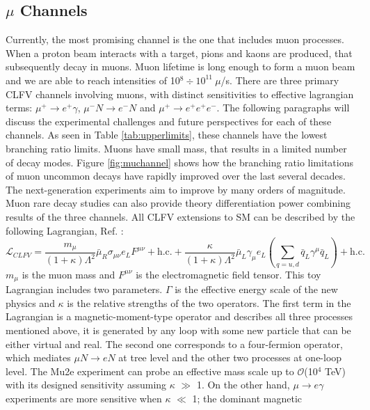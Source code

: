 \subsection{$\mu$ Channels}
Currently, the most promising channel is the one that includes muon processes. When a proton beam interacts with a target, pions and kaons are produced, that subsequently decay in muons. Muon lifetime is long enough to form a muon beam and we are able to reach intensities of 10$^8 \div 10^{11} \  \mu$/s. There are three primary CLFV channels involving muons, with distinct sensitivities to effective lagrangian terms: $\mu^+ \rightarrow e^+ \gamma$, $\mu^- N \rightarrow e^- N$ and $\mu^+ \rightarrow e^+ e^+ e^-$. The following paragraphs will discuss the experimental challenges and future perspectives for each of these channels. As seen in Table \ref{tab:upperlimits}, these channels have the lowest branching ratio limits. Muons have small mass, that results in a limited number of decay modes. Figure \ref{fig:muchannel} shows how the branching ratio limitations of muon uncommon decays have rapidly improved over the last several decades. The next-generation experiments aim to improve by many orders of magnitude. Muon rare decay studies can also provide theory differentiation power combining results of the three channels. All CLFV extensions to SM can be described by the following Lagrangian, Ref. \cite{doi:10.1146/annurev-nucl-100809-131949}:
\begin{equation}\label{LCF}
\mathscr{L}_{C L F V}=\frac{m_\mu}{(1+\kappa) \Lambda^2} \bar{\mu}_R \sigma_{\mu \nu} e_L F^{\mu \nu}+\text{h.c.}+\frac{\kappa}{(1+\kappa) \Lambda^2} \bar{\mu}_L \gamma_\mu e_L\left(\sum_{q=u, d} \bar{q}_L \gamma^\mu \bar{q}_L\right)+\text{h.c.}
\end{equation}
$m_\mu$ is the muon mass and  $F^{\mu \nu}$ is the electromagnetic field tensor. This toy Lagrangian includes two parameters.
$\Gamma$ is the effective energy scale of the new physics and $\kappa$ is the relative strengths of the two operators. The first term in the Lagrangian 
is a magnetic-moment-type operator and describes all three processes mentioned above, it is generated by any loop with some new particle that can be either virtual and real.
The second one corresponds to a four-fermion operator, which mediates $\mu N \rightarrow eN$ at tree level and the other two processes at one-loop level.
The Mu2e experiment can probe an effective mass scale up to $\mathcal{O}$(10$^4$ TeV) with its designed sensitivity assuming $\kappa$ $\gg$ 1.
On the other hand, $\mu \rightarrow e\gamma$ experiments are more sensitive when $\kappa$ $\ll$ 1; the dominant magnetic
